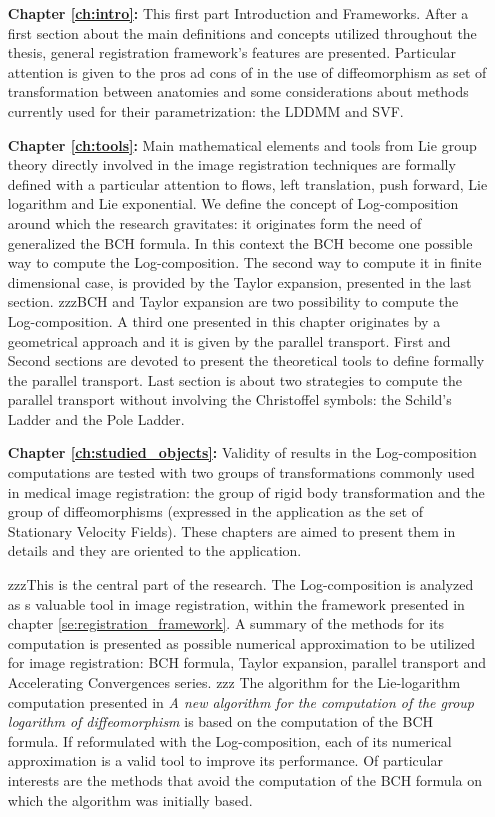 \begin{enumerate}
	\item[{\bf Chapter \ref{ch:intro}:}] This first part Introduction and Frameworks. After a first section about the main definitions and concepts utilized throughout the thesis, general registration framework's features are presented. Particular attention is given to the pros ad cons of in the use of diffeomorphism as set of transformation between anatomies and some considerations about methods currently used for their parametrization: the LDDMM and SVF. 
	
	\item[{\bf Chapter \ref{ch:tools}:}] Main mathematical elements and tools from Lie group theory directly involved in the image registration techniques are formally defined with a particular attention to flows, left translation, push forward, Lie logarithm and Lie exponential. We define the concept of Log-composition around which the research gravitates: it originates form the need of generalized the BCH formula. In this context the BCH become one possible way to compute the Log-composition. The second way to compute it in finite dimensional case, is provided by the Taylor expansion, presented in the last section.
	 zzzBCH and Taylor expansion are two possibility to compute the Log-composition. A third one presented in this chapter originates by a geometrical approach and it is given by the parallel transport. First and Second sections are devoted to present the theoretical tools to define formally the parallel transport. Last section is about two strategies to compute the parallel transport without involving the Christoffel symbols: the Schild's Ladder and the Pole Ladder.
	
	
	\item[{\bf Chapter \ref{ch:studied_objects}:}] Validity of results in the Log-composition computations are tested with two groups of transformations commonly used in medical image registration: the group of rigid body transformation and the group of diffeomorphisms (expressed in the application as the set of Stationary Velocity Fields). These chapters are aimed to present them in details and they are oriented to the application. 
	
	zzzThis is the central part of the research. The Log-composition is analyzed as s valuable tool in image registration, within the framework presented in chapter \ref{se:registration_framework}. A summary of the methods for its computation is presented as possible numerical approximation to be utilized for image registration: BCH formula, Taylor expansion, parallel transport and Accelerating Convergences series. 
    zzz The algorithm for the Lie-logarithm computation presented in \emph{A new algorithm for the computation of the group logarithm of diffeomorphism} \cite{Bossa:08} is based on the computation of the BCH formula. If reformulated with the Log-composition, each of its numerical approximation is a valid tool to improve its performance. Of particular interests are the methods that avoid the computation of the BCH formula on which the algorithm was initially based.
     

\end{enumerate}
